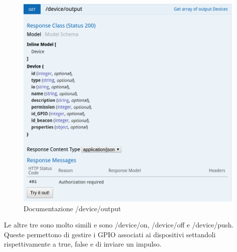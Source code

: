 \begin{figure}[h]
\centering
\includegraphics[width=1\textwidth]{API/device_output.png} 
\caption{Documentazione /device/output}
\label{fig:device:output}
\end{figure}

Le altre tre sono molto simili e sono /device/on, /device/off e /device/push.
Queste permettono di gestire i GPIO associati ai dispositivi settandoli rispettivamente a true, false e di inviare un impulso.

